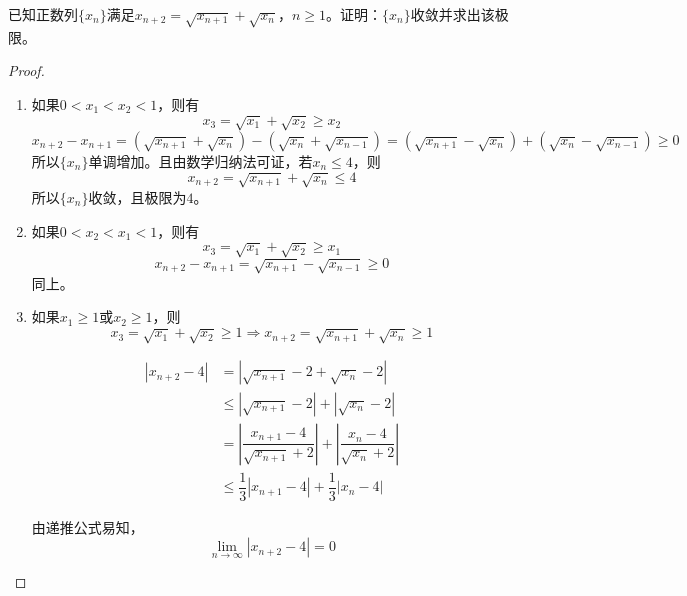 \begin{proposition}
    
    已知正数列$\{x_n\}$满足$x_{n + 2} = \sqrt{x_{n + 1}} + \sqrt{x_{n}}$，$n \geq 1$。证明：$\{x_n\}$收敛并求出该极限。

\end{proposition}

\begin{proof}

    \begin{enumerate}

        \item 
            如果$0 < x_1 < x_2 < 1$，则有
            $$x_3 = \sqrt{x_1} + \sqrt{x_2} \geq x_2$$
            $$x_{n + 2} - x_{n + 1} = (\sqrt{x_{n + 1}} + \sqrt{x_{n}}) - (\sqrt{x_{n}} + \sqrt{x_{n - 1}}) = (\sqrt{x_{n + 1}} - \sqrt{x_{n}}) + (\sqrt{x_{n}} - \sqrt{x_{n - 1}}) \geq 0$$
            所以$\{x_n\}$单调增加。且由数学归纳法可证，若$x_n \leq 4$，则
            $$x_{n + 2} = \sqrt{x_{n + 1}} + \sqrt{x_{n}} \leq 4$$
            所以$\{x_n\}$收敛，且极限为$4$。

        \item 
            如果$0 < x_2 < x_1 < 1$，则有
            $$x_3 = \sqrt{x_1} + \sqrt{x_2} \geq x_1$$
            $$x_{n + 2} - x_{n + 1} = \sqrt{x_{n + 1}} - \sqrt{x_{n - 1}} \geq 0$$
            同上。

        \item 
            如果$x_1 \geq 1$或$x_2 \geq 1$，则
            $$x_3 = \sqrt{x_1} + \sqrt{x_2} \geq 1 \Longrightarrow x_{n + 2} = \sqrt{x_{n + 1}} + \sqrt{x_{n}} \geq 1$$
            
            \begin{align*}
                |x_{n + 2} - 4| & = |\sqrt{x_{n + 1}} - 2 + \sqrt{x_{n}} - 2| \\
                & \leq |\sqrt{x_{n + 1}} - 2| + |\sqrt{x_{n}} - 2| \\
                & = \left|\dfrac{x_{n + 1} - 4}{\sqrt{x_{n + 1}} + 2}\right| + \left|\dfrac{x_{n} - 4}{\sqrt{x_{n}} + 2}\right| \\
                & \leq \dfrac{1}{3} |x_{n + 1} - 4| + \dfrac{1}{3}|x_n - 4| 
            \end{align*}

            由递推公式易知，
            $$\lim\limits_{n \to \infty}{|x_{n + 2} - 4|} = 0$$

    \end{enumerate}

\end{proof}

